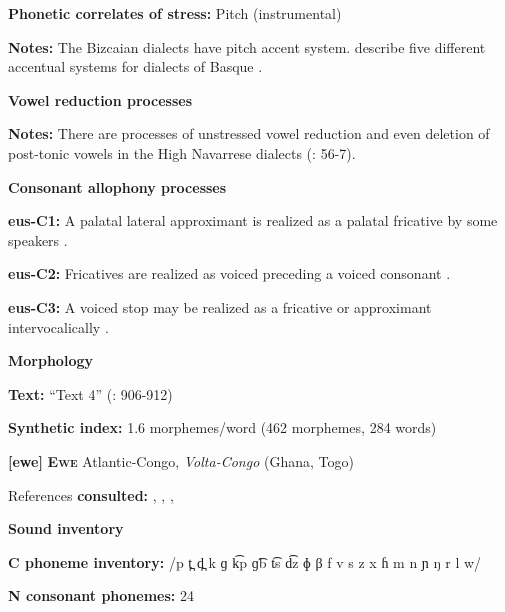 \textbf{Phonetic correlates of stress:} Pitch (instrumental)



\textbf{Notes:} The Bizcaian dialects have pitch accent system. \citet[282--283]{SaltarelliEtAl1988} describe five different accentual systems for dialects of Basque .



\textbf{Vowel reduction processes}



\textbf{Notes:} There are processes of unstressed vowel reduction and even deletion of post-tonic vowels in the High Navarrese dialects (\citealt{HualdeUrbina2003}: 56-7).



\textbf{Consonant allophony processes}



\textbf{eus-C1:} A palatal lateral approximant is realized as a palatal fricative by some speakers \citep[29]{Hualde2003}.



\textbf{eus-C2:} Fricatives are realized as voiced preceding a voiced consonant \citep[24]{Hualde2003}.



\textbf{eus-C3:} A voiced stop may be realized as a fricative or approximant intervocalically \citep[19]{Hualde2003}.



\textbf{Morphology}



\textbf{Text:} “Text 4” (\citealt{HualdeUrbina2003}: 906-912)



\textbf{Synthetic index:} 1.6 morphemes/word (462 morphemes, 284 words)



\textbf{[ewe]}   \textbf{\textsc{Ewe}}  Atlantic-Congo, \textit{Volta-Congo} (Ghana, Togo)



References \textbf{consulted:} \citet{Ameka1991}, \citet{Duthie1996}, \citet{Jalloh2005}, \citet{Stahlke1971}



\textbf{Sound inventory}



\textbf{C phoneme inventory:} /p t̪ d̪ k ɡ k͡p ɡ͡b t͡s d͡z ɸ β f v s z x ɦ m n ɲ ŋ r l w/



\textbf{N consonant phonemes:} 24



